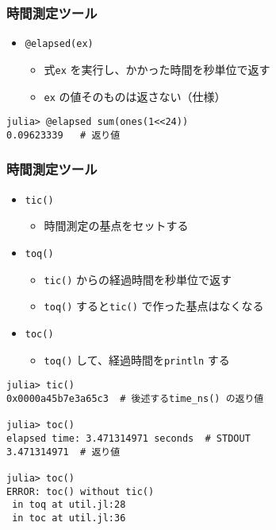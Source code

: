 \begin{frame}[containsverbatim]
  \frametitle{時間測定ツール}
  \begin{itemize}
    \item \verb|@elapsed(ex)|
      \begin{itemize}
        \item 式\verb|ex| を実行し、かかった時間を秒単位で返す
        \item \verb|ex| の値そのものは返さない（仕様）
      \end{itemize}
  \end{itemize}
  \begin{lstlisting}
julia> @elapsed sum(ones(1<<24))
0.09623339   # 返り値
  \end{lstlisting}
\end{frame}

\begin{frame}[containsverbatim]
  \frametitle{時間測定ツール}
  \begin{itemize}
    \item \verb|tic()|
      \begin{itemize}
        \item 時間測定の基点をセットする
      \end{itemize}
    \item \verb|toq()|
      \begin{itemize}
        \item \verb|tic()| からの経過時間を秒単位で返す
        \item \verb|toq()| すると\verb|tic()| で作った基点はなくなる
      \end{itemize}
    \item \verb|toc()|
      \begin{itemize}
        \item \verb|toq()| して、経過時間を\verb|println| する
      \end{itemize}
  \end{itemize}
  \begin{lstlisting}
julia> tic()
0x0000a45b7e3a65c3  # 後述するtime_ns() の返り値

julia> toc()
elapsed time: 3.471314971 seconds  # STDOUT
3.471314971  # 返り値

julia> toc()
ERROR: toc() without tic()
 in toq at util.jl:28
 in toc at util.jl:36
  \end{lstlisting}
\end{frame}

